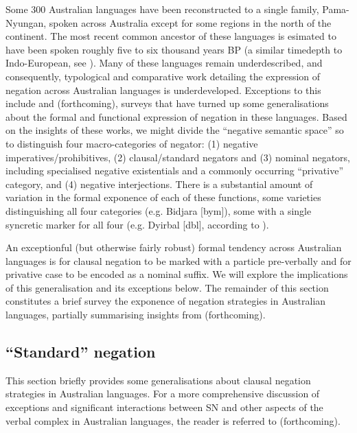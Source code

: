 \documentclass[output=paper]{langsci/langscibook}
\begin{document}
Some 300 Australian languages have been reconstructed to a single family, Pama-Nyungan, spoken across Australia except for some regions in the north of the continent. The most recent common ancestor of these languages is esimated to have been spoken roughly five to six thousand years \textsc{BP} (a similar timedepth to Indo-European, see \citealt[742]{BouckaertBowern2018}). Many of these languages remain underdescribed, and consequently, typological and comparative work detailing the expression of negation across Australian languages is underdeveloped. Exceptions to this include \citealp{Dixon2002a} and \citeauthor{PhillipsFCb} (forthcoming), surveys that have turned up some generalisations about the formal and functional expression of negation in these languages. Based on the insights of these works, we might divide the ``negative semantic space'' so to distinguish four macro-categories of negator: (1) negative imperatives\slash prohibitives, (2) clausal\slash standard negators and (3) nominal negators, including specialised negative existentials and a commonly occurring ``privative'' category, and (4) negative interjections. There is a substantial amount of variation in the formal exponence of each of these functions, some varieties distinguishing all four categories  (e.g. Bidjara [bym]), some with a single syncretic marker for all four (e.g. Dyirbal [dbl], according to \citealp[84--table 3.3]{Dixon2002a}). 

An exceptionful (but otherwise fairly robust) formal tendency across Australian languages is for clausal negation to be marked with a particle pre-verbally and for privative case to be encoded as a nominal suffix. We will explore the implications of this generalisation and its exceptions below. The remainder of this section constitutes a brief survey the exponence of negation strategies in Australian languages, partially summarising insights from \citeauthor{PhillipsFCb} (forthcoming).

\subsection{``Standard'' negation}

This section briefly provides some generalisations about clausal negation strategies in Australian languages. For a more comprehensive discussion of exceptions and significant interactions between SN and other aspects of the verbal complex in Australian languages, the reader is referred to \citeauthor{PhillipsFCb} (forthcoming).
\end{document}
